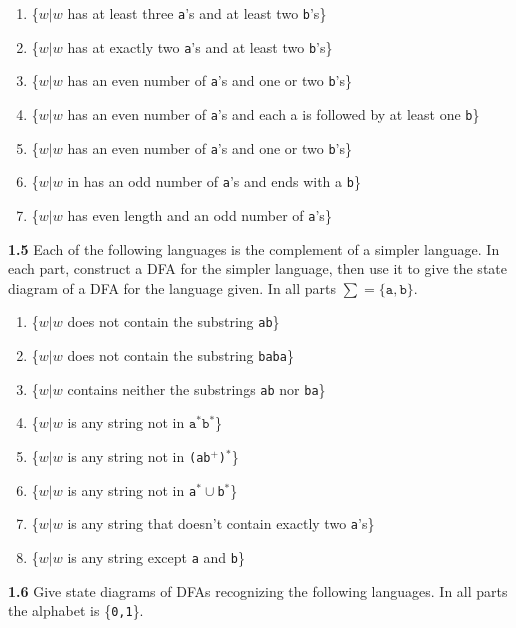 \documentclass{article}
\begin{document}
    \begin{enumerate}
        \item \{$w|w$ has at least three \texttt{a}'s and at least two \texttt{b}'s\}
        \item \{$w|w$ has at exactly two \texttt{a}'s and at least two \texttt{b}'s\}
        \item \{$w|w$ has an even number of \texttt{a}'s and one or two \texttt{b}'s\}
        \item \{$w|w$ has an even number of \texttt{a}'s and each a is followed by at least one \texttt{b}\}
        \item \{$w|w$ has an even number of \texttt{a}'s and one or two \texttt{b}'s\}
        \item \{$w|w$ in has an odd number of \texttt{a}'s and ends with a \texttt{b}\}
        \item \{$w|w$ has even length and an odd number of \texttt{a}'s\}
    \end{enumerate}

\textbf{1.5} Each of the following languages is the complement of a simpler
language. In each part, construct a DFA for the simpler language, then use it to
give the state diagram of a DFA for the language given. In all parts $\sum =
\{\texttt{a}, \texttt{b}\}$.

\begin{enumerate}
\item \{$w|w$ does not contain the substring \texttt{ab}\}
\item \{$w|w$ does not contain the substring \texttt{baba}\}
\item \{$w|w$ contains neither the substrings \texttt{ab} nor \texttt{ba}\}
\item \{$w|w$ is any string not in $\texttt{a}^* \texttt{b}^*$\}
\item \{$w|w$ is any string not in \texttt{(ab$^+$)$^*$}\}
\item \{$w|w$ is any string not in \texttt{a$^*\cup$b$^*$}\}
\item \{$w|w$ is any string that doesn't contain exactly two \texttt{a}'s\}
\item \{$w|w$ is any string except \texttt{a} and \texttt{b}\}
\end{enumerate}

\textbf{1.6} Give state diagrams of DFAs recognizing the following languages. In
all parts the alphabet is \{\texttt{0,1}\}.
\end{document}
